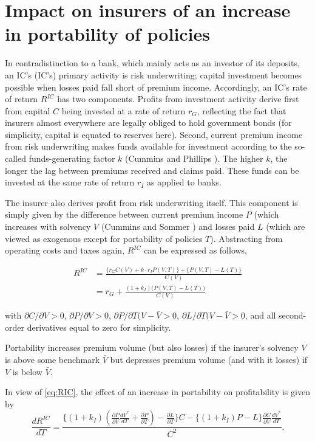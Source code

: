 \section{Impact on insurers of an increase in portability of policies}
\label{sec:impactins}

In contradistinction to a bank, which mainly acts as an investor of its deposits, an \acl{IC}'s (\ac{IC}'s) primary activity is risk underwriting; capital investment becomes possible when losses paid fall short of premium income. Accordingly, an \ac{IC}'s rate of return $R^{IC}$ has two components. Profits from investment activity derive first from capital $C$ being invested at a rate of return $r_G$, reflecting the fact that insurers almost everywhere are legally obliged to hold government bonds (for simplicity, capital is equated to reserves here).  Second, current premium income from risk underwriting makes funds available for investment according to the so-called funds-generating factor $k$ (Cummins and Phillips \cite{cummins2000}). The higher $k$, the longer the lag between premiums received and claims paid. These funds can be invested at the same rate of return $r_I$  as applied to banks.


The insurer also derives profit from risk underwriting itself. This component is simply given by the difference between current premium income $P$ (which increases with solvency $V$ (Cummins and Sommer \cite{cummins1996}) and losses paid $L$ (which are viewed as exogenous except for portability of policies $T$). Abstracting from operating costs and taxes again, $R^{IC}$ can be expressed as follows,

\begin{align}
    R^{IC} &= 
    \frac{\{r_G C(V) + k \cdot r_I P(V, T)\} + \{P(V, T) - L(T)\}}{C(V)} \nonumber\\
    &= r_G + \frac{(1 + k_I) \big(P(V, T) - L(T)\big)}{C(V)} \label{eq:RIC}
\end{align}

\noindent with $\partial C / \partial V>0$, $\partial P / \partial V>0$, $\partial P / \partial T(V-\bar{V}>0$, $\partial L / \partial T(V-\bar{V}>0$, and all second-order derivatives equal to zero for simplicity.

Portability increases premium volume (but also losses) if the insurer's solvency $V$ is above some benchmark $\bar{V}$ but depresses premium volume (and with it losses) if $V$ is below $\bar{V}$.

In view of \autoref{eq:RIC}, the effect of an increase in portability on profitability is given by
\begin{equation}
\frac{dR^{IC}}{dT} = 
\frac{
    \bigg\{
        (1 + k_I) 
        \left( 
            \frac{\partial P}{\partial V} \frac{dV^*}{dT} 
            + \frac{\partial P}{\partial T} 
        \right)
            - \frac{\partial L}{\partial T}
    \bigg\}C
        - \{ (1 + k_I) P - L \}
        \frac{\partial C}{\partial V} \frac{dV^*}{dT}
}{C^2}. \label{eq:dRIC}
\end{equation}

